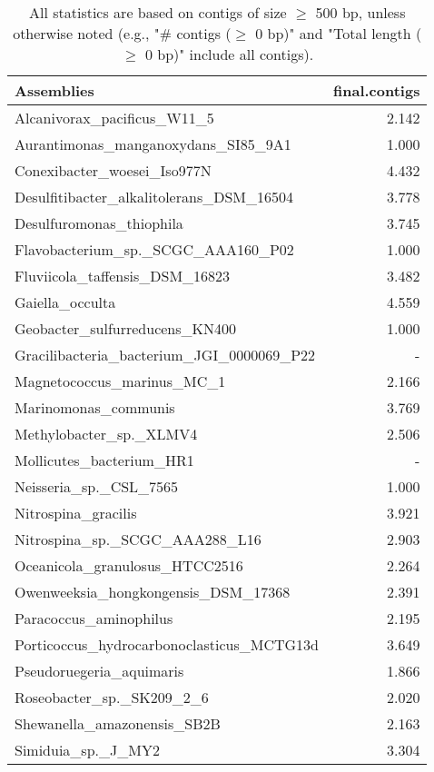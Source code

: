 \documentclass[12pt,a4paper]{article}
\begin{document}
\begin{table}[ht]
\begin{center}
\caption{All statistics are based on contigs of size $\geq$ 500 bp, unless otherwise noted (e.g., "\# contigs ($\geq$ 0 bp)" and "Total length ($\geq$ 0 bp)" include all contigs).}
\begin{tabular}{|l*{1}{|r}|}
\hline
Assemblies & final.contigs \\ \hline
Alcanivorax\_pacificus\_W11\_5 & 2.142 \\ \hline
Aurantimonas\_manganoxydans\_SI85\_9A1 & 1.000 \\ \hline
Conexibacter\_woesei\_Iso977N & 4.432 \\ \hline
Desulfitibacter\_alkalitolerans\_DSM\_16504 & 3.778 \\ \hline
Desulfuromonas\_thiophila & 3.745 \\ \hline
Flavobacterium\_sp.\_SCGC\_AAA160\_P02 & 1.000 \\ \hline
Fluviicola\_taffensis\_DSM\_16823 & 3.482 \\ \hline
Gaiella\_occulta & 4.559 \\ \hline
Geobacter\_sulfurreducens\_KN400 & 1.000 \\ \hline
Gracilibacteria\_bacterium\_JGI\_0000069\_P22 & - \\ \hline
Magnetococcus\_marinus\_MC\_1 & 2.166 \\ \hline
Marinomonas\_communis & 3.769 \\ \hline
Methylobacter\_sp.\_XLMV4 & 2.506 \\ \hline
Mollicutes\_bacterium\_HR1 & - \\ \hline
Neisseria\_sp.\_CSL\_7565 & 1.000 \\ \hline
Nitrospina\_gracilis & 3.921 \\ \hline
Nitrospina\_sp.\_SCGC\_AAA288\_L16 & 2.903 \\ \hline
Oceanicola\_granulosus\_HTCC2516 & 2.264 \\ \hline
Owenweeksia\_hongkongensis\_DSM\_17368 & 2.391 \\ \hline
Paracoccus\_aminophilus & 2.195 \\ \hline
Porticoccus\_hydrocarbonoclasticus\_MCTG13d & 3.649 \\ \hline
Pseudoruegeria\_aquimaris & 1.866 \\ \hline
Roseobacter\_sp.\_SK209\_2\_6 & 2.020 \\ \hline
Shewanella\_amazonensis\_SB2B & 2.163 \\ \hline
Simiduia\_sp.\_J\_MY2 & 3.304 \\ \hline

\end{tabular}
\end{center}
\end{table}
\end{document}
